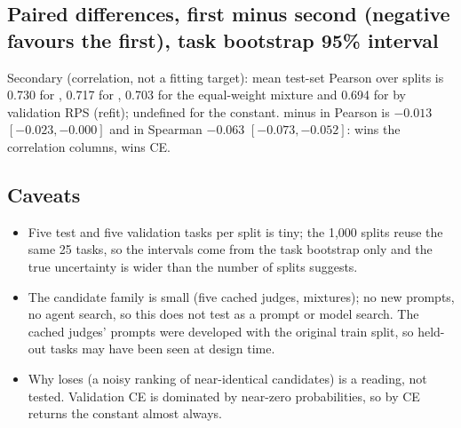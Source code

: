 \subsection*{Paired differences, first minus second (negative favours the first), task bootstrap 95\% interval}
\begin{center}\small
{}
\end{center}

Secondary (correlation, not a fitting target): mean test-set Pearson over splits is 0.730 for , 0.717 for , 0.703 for the
equal-weight mixture and 0.694 for  by validation RPS (refit); undefined for the constant.  minus  in Pearson is $-0.013$
$[-0.023, -0.000]$ and in Spearman $-0.063$ $[-0.073, -0.052]$:  wins the correlation columns,  wins CE.

\subsection*{Caveats}
\begin{itemize}
  \item Five test and five validation tasks per split is tiny; the 1,000 splits reuse the same 25 tasks, so the intervals come from the task bootstrap only and the true uncertainty is wider than the number of splits suggests.
  \item The candidate family is small (five cached judges, mixtures); no new prompts, no agent search, so this does not test  as a prompt or model search. The cached judges' prompts were developed with the original train split, so held-out tasks may have been seen at design time.
  \item Why  loses (a noisy ranking of near-identical candidates) is a reading, not tested. Validation CE is dominated by near-zero probabilities, so  by CE returns the constant almost always.
\end{itemize}

